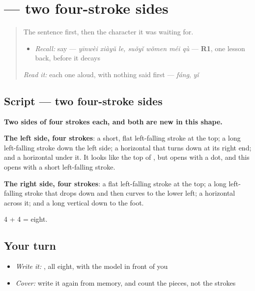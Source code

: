 \section[\texorpdfstring{\zh{所} (suǒ)}{所 (suǒ)}]{ — two four-stroke sides}

\label{lesson:ZH-W281-suo}



\begin{quote}
The sentence first, then the character it was waiting for.

\begin{itemize}
\raggedright
  \item \emph{Recall:} say   — \emph{yīnwèi xiàyǔ le, suǒyǐ wǒmen méi qù} — \textbf{R1}, one lesson back, before it decays
\end{itemize}

\begin{quote}
 
\end{quote}

\emph{Read it:} each one aloud, with nothing said first — \emph{fáng}, \emph{yǐ}
\end{quote}

\subsection*{Script — two four-stroke sides}

\begin{quote}
\end{quote}

\textbf{Two sides of four strokes each, and both are new in this shape.}

\textbf{The left side, four strokes}: a short, flat left-falling stroke at the top; a long left-falling stroke down the left side; a horizontal that turns down at its right end; and a horizontal under it. It looks like the top of , but  opens with a dot, and this opens with a short left-falling stroke.

\textbf{The right side, four strokes}: a flat left-falling stroke at the top; a long left-falling stroke that drops down and then curves to the lower left; a horizontal across it; and a long vertical down to the foot.

4 + 4 = eight.

\subsection*{Your turn}
\begin{itemize}
\raggedright
  \item \emph{Write it:} , all eight, with the model in front of you
  \item \emph{Cover:} write it again from memory, and count the pieces, not the strokes
\end{itemize}

